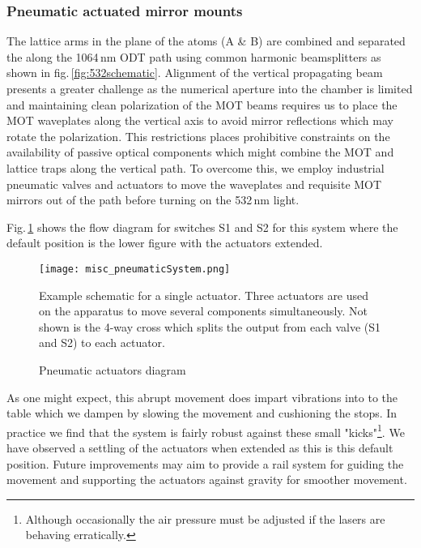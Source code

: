 \subsubsection{Pneumatic actuated mirror mounts}
The lattice arms in the plane of the atoms (A \& B) are combined and separated the along the 1064\,nm ODT path using common harmonic beamsplitters as shown in fig.\,\ref{fig:532schematic}.
Alignment of the vertical propagating beam presents a greater challenge as the numerical aperture into the chamber is limited and maintaining clean polarization of the MOT beams requires us to place the MOT waveplates along the vertical axis to avoid mirror reflections which may rotate the polarization.
This restrictions places prohibitive constraints on the availability of passive optical components which might combine the MOT and lattice traps along the vertical path.
To overcome this, we employ industrial pneumatic valves and actuators to move the waveplates and requisite MOT mirrors out of the path before turning on the 532\,nm light.

Fig.\,\ref{fig:pnuSys} shows the flow diagram for switches S1 and S2 for this system where the default position is the lower figure with the actuators extended.
	\begin{figure}
		\centerline{
		\texttt{[image: misc\_pneumaticSystem.png]}}
		\caption{Pneumatic actuators diagram}{Example schematic for a single actuator. Three actuators are used on the apparatus to move several components simultaneously. Not shown is the 4-way cross which splits the output from each valve (S1 and S2) to each actuator.}
		\label{fig:pnuSys}
	\end{figure}
As one might expect, this abrupt movement does impart vibrations into to the table which we dampen by slowing the movement and cushioning the stops.
In practice we find that the system is fairly robust against these small "kicks"\footnote{Although occasionally the air pressure must be adjusted if the lasers are behaving erratically.}.
We have observed a settling of the actuators when extended as this is this default position.
Future improvements may aim to provide a rail system for guiding the movement and supporting the actuators against gravity for smoother movement.